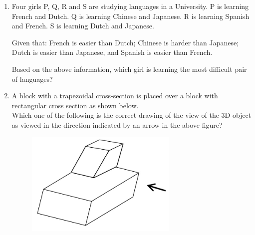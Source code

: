 \documentclass[journal,12pt,onecolumn]{IEEEtran}
\theoremstyle{remark}
\begin{document}
\begin{enumerate}
\item Four girls P, Q, R and S are studying languages in a University. P is learning French and Dutch. Q is learning Chinese and Japanese. R is learning Spanish and French. S is learning Dutch and Japanese.  

Given that: French is easier than Dutch; Chinese is harder than Japanese; Dutch is easier than Japanese, and Spanish is easier than French.  

Based on the above information, which girl is learning the most difficult pair of languages?

\hfill{}

\begin{enumerate}
\end{enumerate}
 
\pagebreak

\item A block with a trapezoidal cross-section is placed over a block with rectangular
cross section as shown below.\\
Which one of the following is the correct drawing of the view of the 3D object
as viewed in the direction indicated by an arrow in the above figure?

\hfill{}

\begin{figure}[h!]
  \centering
  \includegraphics[width=0.3\columnwidth]{figs/fig1.png} 
   \caption*{}
  \label{fig:Q5}
\end{figure}


\end{enumerate}
\end{document}
